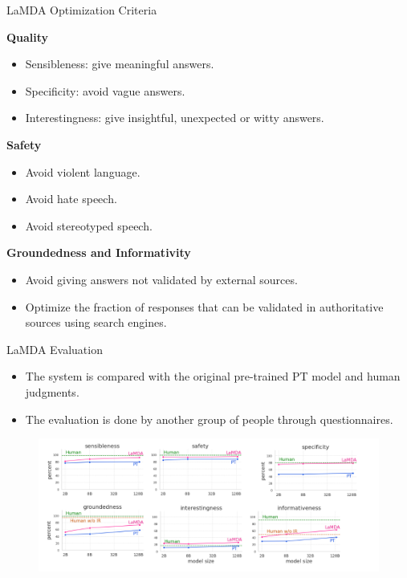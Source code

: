 \documentclass[handout]{beamer}
\begin{document}
\begin{frame}{LaMDA Optimization Criteria}
\begin{scriptsize}

\textbf{Quality}
\begin{itemize}
\item Sensibleness: give meaningful answers.
\item Specificity: avoid vague answers.
\item Interestingness: give insightful, unexpected or witty answers.
\end{itemize}

\textbf{Safety}
\begin{itemize}
\item Avoid violent language.
\item Avoid hate speech.
\item Avoid stereotyped speech.
\end{itemize}

\textbf{Groundedness and Informativity}
\begin{itemize}
\item Avoid giving answers not validated by external sources.
\item Optimize the fraction of responses that can be validated in authoritative sources using search engines.

\end{itemize}
\end{scriptsize}


\end{frame}


\begin{frame}{LaMDA Evaluation}

\begin{scriptsize}
\begin{itemize}
\item The system is compared with the original pre-trained PT model and human judgments.
\item The evaluation is done by another group of people through questionnaires.
\end{itemize}
 \begin{figure}[h]
        	\includegraphics[scale = 0.45]{pics/lambdaresults.png}
        \end{figure}

\end{scriptsize}

\end{frame}
\end{document}
